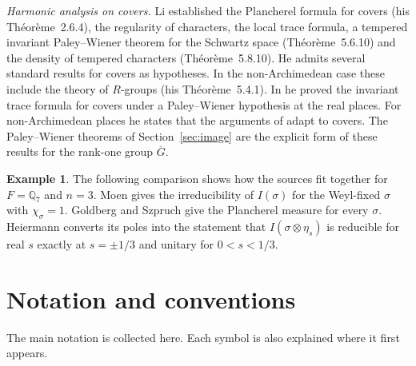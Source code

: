 \documentclass[12pt,letterpaper]{article}
\numberwithin{equation}{section}
\theoremstyle{definition}
\newtheorem{xexample}[theorem]{Example}
\newcommand{\Q}{\mathbb Q}
\newcommand{\bG}{\overline{G}}
\begin{document}
\emph{Harmonic analysis on covers.}  Li \cite{Li12} established the Plancherel formula
for covers (his Th\'eor\`eme~2.6.4), the regularity of characters, the local trace formula,
a tempered invariant Paley--Wiener theorem for the Schwartz space (Th\'eor\`eme~5.6.10)
and the density of tempered characters (Th\'eor\`eme~5.8.10).  He admits several standard
results for covers as hypotheses.  In the non-Archimedean case these include the theory of
$R$-groups (his Th\'eor\`eme~5.4.1).  In \cite{Li14} he proved the invariant trace formula
for covers under a Paley--Wiener hypothesis at the real places.  For non-Archimedean
places he states that the arguments of \cite{BDK86} adapt to covers.  The Paley--Wiener
theorems of Section~\ref{sec:image} are the explicit form of these results for the rank-one
group $\bG$.

\begin{xexample}\label{ex:lit}
The following comparison shows how the sources fit together for $F=\Q_7$ and $n=3$.
Moen \cite{Mo88} gives the irreducibility of $I(\sigma)$ for the Weyl-fixed $\sigma$ with
$\chi_\sigma=1$.  Goldberg and Szpruch \cite{GS16} give the Plancherel measure for every
$\sigma$.  Heiermann \cite{He25} converts its poles into the statement that
$I(\sigma\otimes\eta_s)$ is reducible for real $s$ exactly at $s=\pm1/3$ and unitary for $0<s<1/3$.
\end{xexample}

\section*{Notation and conventions}

The main notation is collected here.  Each symbol is also explained where it first appears.
\end{document}
